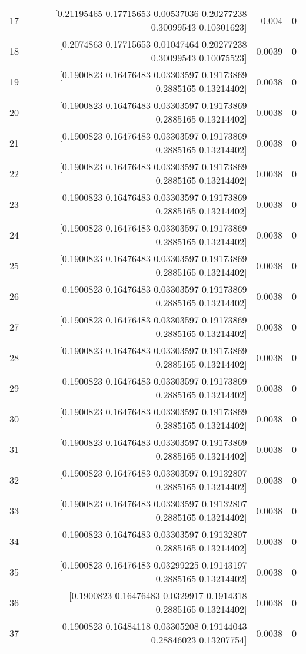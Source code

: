 \begin{longtable}{lrrr}
17 & [0.21195465 0.17715653 0.00537036 0.20277238 0.30099543 0.10301623] & 0.004 & 0 \\
18 & [0.2074863  0.17715653 0.01047464 0.20277238 0.30099543 0.10075523] & 0.0039 & 0 \\
19 & [0.1900823  0.16476483 0.03303597 0.19173869 0.2885165  0.13214402] & 0.0038 & 0 \\
20 & [0.1900823  0.16476483 0.03303597 0.19173869 0.2885165  0.13214402] & 0.0038 & 0 \\
21 & [0.1900823  0.16476483 0.03303597 0.19173869 0.2885165  0.13214402] & 0.0038 & 0 \\
22 & [0.1900823  0.16476483 0.03303597 0.19173869 0.2885165  0.13214402] & 0.0038 & 0 \\
23 & [0.1900823  0.16476483 0.03303597 0.19173869 0.2885165  0.13214402] & 0.0038 & 0 \\
24 & [0.1900823  0.16476483 0.03303597 0.19173869 0.2885165  0.13214402] & 0.0038 & 0 \\
25 & [0.1900823  0.16476483 0.03303597 0.19173869 0.2885165  0.13214402] & 0.0038 & 0 \\
26 & [0.1900823  0.16476483 0.03303597 0.19173869 0.2885165  0.13214402] & 0.0038 & 0 \\
27 & [0.1900823  0.16476483 0.03303597 0.19173869 0.2885165  0.13214402] & 0.0038 & 0 \\
28 & [0.1900823  0.16476483 0.03303597 0.19173869 0.2885165  0.13214402] & 0.0038 & 0 \\
29 & [0.1900823  0.16476483 0.03303597 0.19173869 0.2885165  0.13214402] & 0.0038 & 0 \\
30 & [0.1900823  0.16476483 0.03303597 0.19173869 0.2885165  0.13214402] & 0.0038 & 0 \\
31 & [0.1900823  0.16476483 0.03303597 0.19173869 0.2885165  0.13214402] & 0.0038 & 0 \\
32 & [0.1900823  0.16476483 0.03303597 0.19132807 0.2885165  0.13214402] & 0.0038 & 0 \\
33 & [0.1900823  0.16476483 0.03303597 0.19132807 0.2885165  0.13214402] & 0.0038 & 0 \\
34 & [0.1900823  0.16476483 0.03303597 0.19132807 0.2885165  0.13214402] & 0.0038 & 0 \\
35 & [0.1900823  0.16476483 0.03299225 0.19143197 0.2885165  0.13214402] & 0.0038 & 0 \\
36 & [0.1900823  0.16476483 0.0329917  0.1914318  0.2885165  0.13214402] & 0.0038 & 0 \\
37 & [0.1900823  0.16484118 0.03305208 0.19144043 0.28846023 0.13207754] & 0.0038 & 0 \\

\end{longtable}

